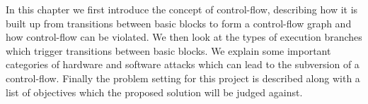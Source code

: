 In this chapter we first introduce the concept of control-flow, describing how it is built up from transitions between basic blocks to form a control-flow graph and how control-flow can be violated. We then look at the types of execution branches which trigger transitions between basic blocks. We explain some important categories of hardware and software attacks which can lead to the subversion of a control-flow. Finally the problem setting for this project is described along with a list of objectives which the proposed solution will be judged against.